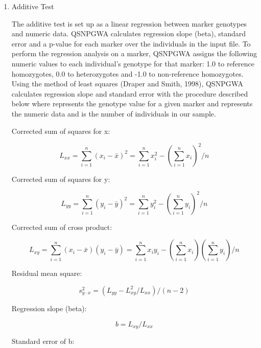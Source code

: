 \begin{enumerate}
  \item{Additive Test}

    The additive test is set up as a linear regression between marker genotypes
    and numeric data.  QSNPGWA calculates regression slope (beta), standard
    error and a p-value for each marker over the individuals in the input file.
    To perform the regression analysis on a marker, QSNPGWA assigns the
    following numeric values to each individual’s genotype for that marker: 1.0
    to reference homozygotes, 0.0 to heterozygotes and -1.0 to non-reference
    homozygotes.  Using the method of least squares (Draper and Smith, 1998),
    QSNPGWA calculates regression slope and standard error with the procedure
    described below where represents the genotype value for a given marker and
    represents the numeric data and is the number of individuals in our sample.

    Corrected sum of squares for x:

    \begin{equation*}
      L_{xx} = \sum^n_{i=1}\left(x_i - \bar{x}\right)^2 = \sum^n_{i=1}x^2_i - \left(\sum^n_{i=1}x_i\right)^2/n
    \end{equation*}

    Corrected sum of squares for y:

    \begin{equation*}
      L_{yy} = \sum^n_{i=1}\left(y_i - \bar{y}\right)^2 = \sum^n_{i=1}y^2_i - \left(\sum^n_{i=1}y_i\right)^2/n
    \end{equation*}

    Corrected sum of cross product:

    \begin{equation*}
      L_{xy} = \sum^n_{i=1}\left(x_i-\bar{x}\right)\left(y_i-\bar{y}\right) = \sum^n_{i=1}x_iy_i - \left(\sum^n_{i=1}x_i\right)\left(\sum^n_{i=1}y_i\right)/n
    \end{equation*}

    Residual mean square:

    \begin{equation*}
      s^2_{y\cdot{}x} = \left(L_{yy} - L^2_{xy}/L_{xx}\right)/\left(n-2\right)
    \end{equation*}

    Regression slope (beta):

    \begin{equation*}
      b = L_{xy}/L_{xx}
    \end{equation*}

    Standard error of b:


\end{enumerate}
